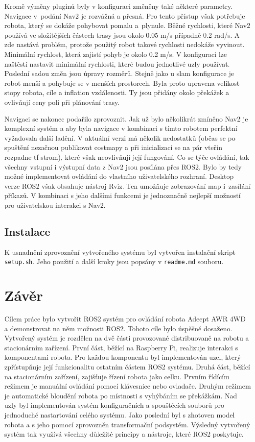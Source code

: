 Kromě výměny pluginů byly v konfiguraci změněny také některé parametry. Navigace v~podání Nav2 je rozvážná a přesná. Pro tento přístup však potřebuje robota, který se dokáže pohybovat pomalu a~plynule. Běžné rychlosti, které Nav2 používá ve složitějších částech trasy jsou okolo 0.05 m/s případně 0.2 rad/s. A zde nastává problém, protože použitý robot takové rychlosti nedokáže vyvinout. Minimální rychlost, která zajistí pohyb je okolo 0.2 m/s. V konfiguraci lze naštěstí nastavit minimální rychlosti, které budou jednotlivé uzly používat. Poslední sadou změn jsou úpravy rozměrů. Stejně jako u slam konfigurace je robot menší a pohybuje se v menších prostorech. Byla proto upravena velikost stopy robota, cíle a inflation vzdálenosti. Ty jsou přidány okolo překážek a ovlivňují ceny polí při plánování trasy.

Navigaci se nakonec podařilo zprovoznit. Jak už bylo několikrát zmíněno Nav2 je komplexní systém a aby byla navigace v kombinaci s tímto robotem perfektní vyžadovala další ladění. V aktuální verzi má několik nedostatků (občas se po spuštění nezačnou publikovat costmapy a při inicializaci se na pár vteřin rozpadne tf strom), které však neovlivňují její fungování. Co se týče ovládání, tak všechny vstupní i výstupní data z Nav2 jsou posílána přes ROS2. Bylo by tedy možné implementovat ovládání do vlastního uživatelského rozhraní. Desktop verze ROS2 však obsahuje nástroj Rviz. Ten umožňuje zobrazování map i~zasílání příkazů. V kombinaci s jeho dalšími funkcemi je jednoznačně nejlepší možností pro uživatelskou interakci s Nav2.

\section*{Instalace}
K usnadnění zprovoznění vytvořeného systému byl vytvořen instalační skript \verb|setup.sh|. Jeho použití a další kroky jsou popsány v \verb|readme.md| souboru.

\chapter{Závěr}
Cílem práce bylo vytvořit ROS2 systém pro ovládání robota Adeept AWR 4WD a demonstrovat na něm možnosti ROS2. Tohoto cíle bylo úspěšně dosaženo. Vytvořený systém je rozdělen na dvě části provozované distribuovaně na robotu a stacionárním zařízení. První část, běžící na Raspberry Pi, realizuje interakci s komponentami robota. Pro každou komponentu byl implementován uzel, který zpřístupňuje její funkcionalitu ostatním částem ROS2 systému. Druhá část, běžící na stacionárním zařízení, zajišťuje řízení robota jako celku. Prvním řídícím režimem je manuální ovládání pomocí klávesnice nebo ovladače. Druhým režimem je automatické bloudění robota po místnosti s vyhýbáním se překážkám. Nad uzly byl implementován systém konfiguračních a spouštěcích souborů pro jednoduché nastartování celého systému. Jako poslední byl s zhotoven model robota a s jeho pomocí zprovozněn transformační podsystém. Výsledný vytvořený systém tak využívá všechny důležité principy a nástroje, které ROS2 poskytuje.

